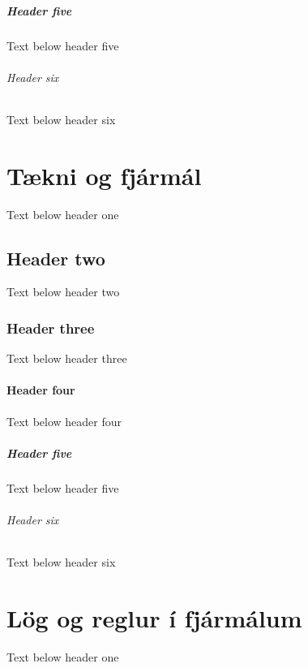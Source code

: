 \documentclass[a4paper,10pt,icelandic]{sphinxmanual}
\begin{document}
\paragraph{Header five}
\label{\detokenize{fjarmal-fjolskyldunnar/index:header-five}}
\sphinxAtStartPar
Text below header five


\subparagraph{Header six}
\label{\detokenize{fjarmal-fjolskyldunnar/index:header-six}}
\sphinxAtStartPar
Text below header six

\sphinxstepscope


\chapter{Tækni og fjármál}
\label{\detokenize{taekni-og-fjarmal/index:taekni-og-fjarmal}}\label{\detokenize{taekni-og-fjarmal/index::doc}}
\sphinxAtStartPar
Text below header one


\section{Header two}
\label{\detokenize{taekni-og-fjarmal/index:header-two}}
\sphinxAtStartPar
Text below header two


\subsection{Header three}
\label{\detokenize{taekni-og-fjarmal/index:header-three}}
\sphinxAtStartPar
Text below header three


\subsubsection{Header four}
\label{\detokenize{taekni-og-fjarmal/index:header-four}}
\sphinxAtStartPar
Text below header four


\paragraph{Header five}
\label{\detokenize{taekni-og-fjarmal/index:header-five}}
\sphinxAtStartPar
Text below header five


\subparagraph{Header six}
\label{\detokenize{taekni-og-fjarmal/index:header-six}}
\sphinxAtStartPar
Text below header six

\sphinxstepscope


\chapter{Lög og reglur í fjármálum}
\label{\detokenize{log-og-reglur-i-fjarmalum/index:log-og-reglur-i-fjarmalum}}\label{\detokenize{log-og-reglur-i-fjarmalum/index::doc}}
\sphinxAtStartPar
Text below header one
\end{document}
